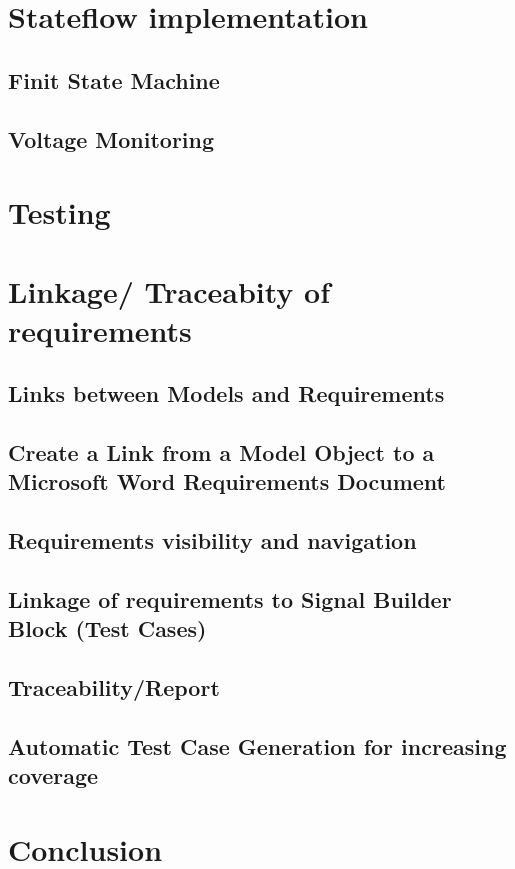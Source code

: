 \section{Stateflow implementation}

	\subsection{Finit State Machine}
	
	\subsection{Voltage Monitoring}


\section{Testing}


\section{Linkage/ Traceabity of requirements}


	\subsection{Links between Models and Requirements}
	
	
	\subsection{Create a Link from a Model Object to a Microsoft Word Requirements Document}
	
	
	\subsection{Requirements visibility and navigation}
	
	
	\subsection{Linkage of requirements to Signal Builder Block (Test Cases)}
	
	
	
	\subsection{Traceability/Report}
	
	
	\subsection{Automatic Test Case Generation for increasing coverage}
	
	
	
\section{Conclusion}